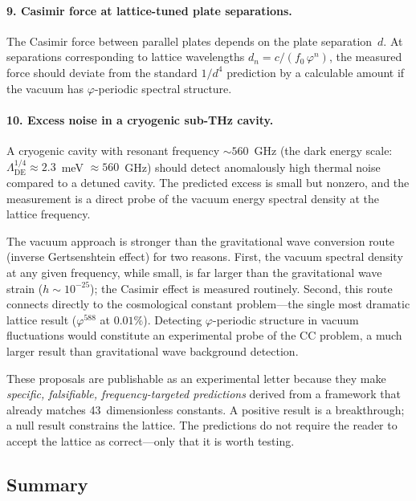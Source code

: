\documentclass[12pt,a4paper]{article}
\newcommand{\vp}{\varphi}
\begin{document}
\paragraph{9. Casimir force at lattice-tuned plate separations.}
The Casimir force between parallel plates depends on the plate separation~$d$.
At separations corresponding to lattice wavelengths
$d_n = c/(f_0\,\vp^n)$, the measured force should deviate from the standard
$1/d^4$ prediction by a calculable amount if the vacuum has $\vp$-periodic
spectral structure.

\paragraph{10. Excess noise in a cryogenic sub-THz cavity.}
A cryogenic cavity with resonant frequency $\sim\!560$~GHz (the dark energy
scale: $\Lambda_{\mathrm{DE}}^{1/4} \approx 2.3$~meV $\approx 560$~GHz)
should detect anomalously high thermal noise compared to a detuned cavity.
The predicted excess is small but nonzero, and the measurement is a direct
probe of the vacuum energy spectral density at the lattice frequency.

\medskip

The vacuum approach is stronger than the gravitational wave conversion route
(inverse Gertsenshtein effect) for two reasons.  First, the vacuum spectral
density at any given frequency, while small, is far larger than the
gravitational wave strain ($h \sim 10^{-25}$); the Casimir effect is
measured routinely.  Second, this route connects directly to the cosmological
constant problem---the single most dramatic lattice result ($\vp^{588}$ at
$0.01\%$).  Detecting $\vp$-periodic structure in vacuum fluctuations would
constitute an experimental probe of the CC problem, a much larger result than
gravitational wave background detection.

These proposals are publishable as an experimental letter because they make
\emph{specific, falsifiable, frequency-targeted predictions} derived from a
framework that already matches 43~dimensionless constants.  A positive result
is a breakthrough; a null result constrains the lattice.  The predictions do
not require the reader to accept the lattice as correct---only that it is
worth testing.

\subsection{Summary}
\label{sec:prediction_summary}
\end{document}
